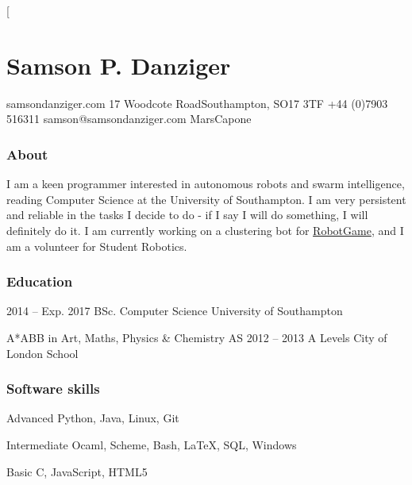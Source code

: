 \documentclass{tccv}
\begin{document}
\twocolumn[

\part{Samson P. Danziger}

\begin{multicols}{2}
    \personal
        {samsondanziger.com}
        {17 Woodcote Road\newline Southampton, SO17 3TF}
        {+44 (0)7903 516311}
        {samson@samsondanziger.com}
        {MarsCapone}
    
    \section{About}
        I am a keen programmer interested in autonomous robots and swarm intelligence, reading Computer Science at the University of Southampton. I am very persistent and reliable in the tasks I decide to do - if I say I will do something, I will definitely do it. I am currently working on a clustering bot for \href{https://robotgame.net}{RobotGame}, and I am a volunteer for Student Robotics.

\end{multicols}

\hline
\bigskip

\begin{multicols}{2}
    \section{Education}
    
        \begin{yearlist}
        
        \item{2014 -- Exp. 2017}
             {BSc. Computer Science}
             {University of Southampton}
        
        {\item[A*ABB in Art, Maths, Physics \& Chemistry AS]{2012 -- 2013}
             {A Levels}
             {City of London School}}
        
        
        \end{yearlist}
        
    \section{Software skills}
    
        \begin{factlist}
        
        \item{Advanced}
             {Python, Java, Linux, Git}
        
        \item{Intermediate}
             {Ocaml, Scheme, Bash, \LaTeX, SQL, Windows}
        
        \item{Basic}
             {C, JavaScript, HTML5}
        
        \end{factlist}
        
\end{multicols}
\end{document}
